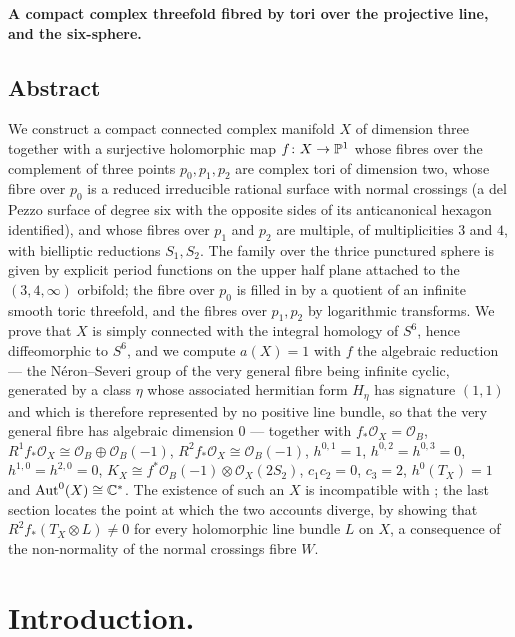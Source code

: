 \begin{center}
{\large\bfseries A compact complex threefold fibred by tori over the projective line, and the six-sphere.}
\end{center}

\subsection*{Abstract}
We construct a compact connected complex manifold $X$ of dimension three together with a surjective holomorphic map $f\colon X \to \mathbb{P}^1$ whose fibres over the complement of three points $p_0, p_1, p_2$ are complex tori of dimension two, whose fibre over $p_0$ is a reduced irreducible rational surface with normal crossings (a del Pezzo surface of degree six with the opposite sides of its anticanonical hexagon identified), and whose fibres over $p_1$ and $p_2$ are multiple, of multiplicities $3$ and $4$, with bielliptic reductions $S_1, S_2$. The family over the thrice punctured sphere is given by explicit period functions on the upper half plane attached to the $(3,4,\infty)$ orbifold; the fibre over $p_0$ is filled in by a quotient of an infinite smooth toric threefold, and the fibres over $p_1, p_2$ by logarithmic transforms. We prove that $X$ is simply connected with the integral homology of $S^6$, hence diffeomorphic to $S^6$, and we compute $a(X) = 1$ with $f$ the algebraic reduction --- the N\'eron--Severi group of the very general fibre being infinite cyclic, generated by a class $\eta$ whose associated hermitian form $H_\eta$ has signature $(1,1)$ and which is therefore represented by no positive line bundle, so that the very general fibre has algebraic dimension $0$ --- together with $f_*\mathcal O_X = \mathcal O_B$, $R^1 f_* \mathcal O_X \cong \mathcal O_B \oplus \mathcal O_B(-1)$, $R^2 f_*\mathcal O_X \cong \mathcal O_B(-1)$, $h^{0,1} = 1$, $h^{0,2} = h^{0,3} = 0$, $h^{1,0} = h^{2,0} = 0$, $K_X \cong f^*\mathcal O_B(-1) \otimes \mathcal O_X(2S_2)$, $c_1 c_2 = 0$, $c_3 = 2$, $h^0(T_X) = 1$ and $\mathrm{Aut}^0(X) \cong \mathbb{C}^*$. The existence of such an $X$ is incompatible with \cite[Cor.\ 2.3]{CDP20}; the last section locates the point at which the two accounts diverge, by showing that $R^2 f_*(T_X \otimes L) \ne 0$ for every holomorphic line bundle $L$ on $X$, a consequence of the non-normality of the normal crossings fibre $W$.

\section{Introduction.}

